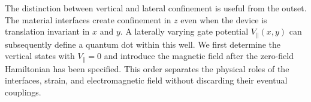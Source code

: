 The distinction between vertical and lateral confinement is useful from the outset. The material interfaces create confinement in $z$ even when the device is translation invariant in $x$ and $y$. A laterally varying gate potential $V_\parallel(x,y)$ can subsequently define a quantum dot within this well. We first determine the vertical states with $V_\parallel=0$ and introduce the magnetic field after the zero-field Hamiltonian has been specified. This order separates the physical roles of the interfaces, strain, and electromagnetic field without discarding their eventual couplings.

